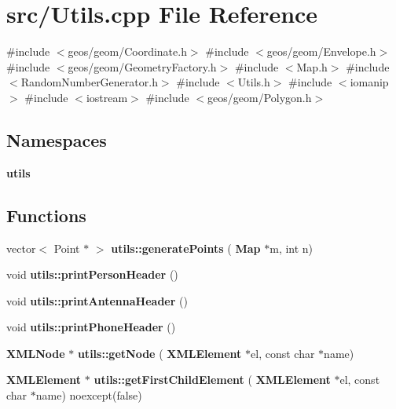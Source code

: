 \section{src/\+Utils.cpp File Reference}
\label{_utils_8cpp}
{\ttfamily \#include $<$geos/geom/\+Coordinate.\+h$>$}\newline
{\ttfamily \#include $<$geos/geom/\+Envelope.\+h$>$}\newline
{\ttfamily \#include $<$geos/geom/\+Geometry\+Factory.\+h$>$}\newline
{\ttfamily \#include $<$Map.\+h$>$}\newline
{\ttfamily \#include $<$Random\+Number\+Generator.\+h$>$}\newline
{\ttfamily \#include $<$Utils.\+h$>$}\newline
{\ttfamily \#include $<$iomanip$>$}\newline
{\ttfamily \#include $<$iostream$>$}\newline
{\ttfamily \#include $<$geos/geom/\+Polygon.\+h$>$}\newline
\subsection*{Namespaces}
\begin{DoxyCompactItemize}
\item 
 \textbf{ utils}
\end{DoxyCompactItemize}
\subsection*{Functions}
\begin{DoxyCompactItemize}
\item 
vector$<$ Point $\ast$ $>$ \textbf{ utils\+::generate\+Points} (\textbf{ Map} $\ast$m, int n)
\item 
void \textbf{ utils\+::print\+Person\+Header} ()
\item 
void \textbf{ utils\+::print\+Antenna\+Header} ()
\item 
void \textbf{ utils\+::print\+Phone\+Header} ()
\item 
\textbf{ X\+M\+L\+Node} $\ast$ \textbf{ utils\+::get\+Node} (\textbf{ X\+M\+L\+Element} $\ast$el, const char $\ast$name)
\item 
\textbf{ X\+M\+L\+Element} $\ast$ \textbf{ utils\+::get\+First\+Child\+Element} (\textbf{ X\+M\+L\+Element} $\ast$el, const char $\ast$name) noexcept(false)
\end{DoxyCompactItemize}
